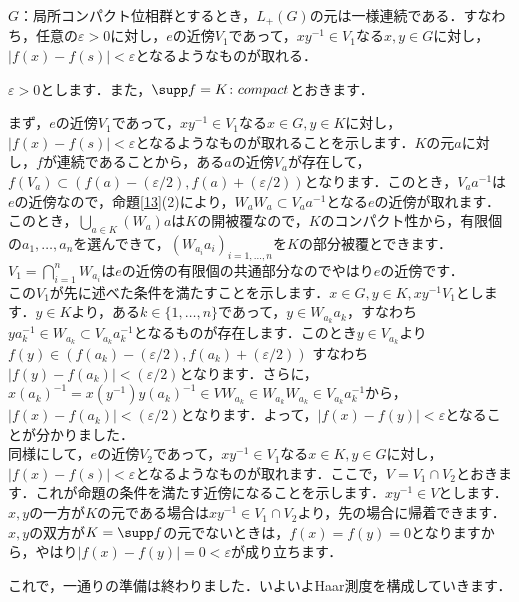 \begin{prop}\label{16}
$G$：局所コンパクト位相群とするとき，$L_{+}(G)$の元は一様連続である．すなわち，任意の$\varepsilon>0$に対し，$e$の近傍$V_1$であって，$xy^{-1} \in V_1$なる$x,y \in G$に対し，$|f(x)-f(s)|<\varepsilon$となるようなものが取れる．
\end{prop}
\begin{Proof}
$\varepsilon>0$とします．また，$\supp f=K \colon compact$とおきます．

まず，$e$の近傍$V_1$であって，$xy^{-1} \in V_1$なる$x \in G, y \in K$に対し，$|f(x)-f(s)|<\varepsilon$となるようなものが取れることを示します．$K$の元$a$に対し，$f$が連続であることから，ある$a$の近傍$V_a$が存在して，$f(V_a) \subset (f(a)-(\varepsilon /2), f(a)+(\varepsilon /2) )$となります．このとき，$V_{a}a^{-1}$は$e$の近傍なので，命題\ref{13}(2)により，$W_{a}W_{a} \subset V_{a}a^{-1}$となる$e$の近傍が取れます．このとき，$\bigcup_{a \in K}(W_a)a$は$K$の開被覆なので，$K$のコンパクト性から，有限個の$a_1, \ldots, a_n$を選んできて，$( W_{a_i}a_{i} )_{i=1,\ldots,n}$を$K$の部分被覆とできます．$V_1=\bigcap_{i=1}^{n}W_{a_i}$は$e$の近傍の有限個の共通部分なのでやはり$e$の近傍です．\\

この$V_1$が先に述べた条件を満たすことを示します．$x \in G, y \in K, xy^{-1} V_1$とします．$y \in K$より，ある$k \in \{1, \ldots , n \}$であって，$y \in W_{a_k}a_{k}$，すなわち$ya_{k}^{-1} \in W_{a_k} \subset V_{a_k}a_{k}^{-1}$となるものが存在します．このとき$y \in V_{a_k}$より$f(y) \in (f(a_k)-(\varepsilon/2), f(a_k)+(\varepsilon /2) )$ すなわち $|f(y)-f(a_k)|<(\varepsilon /2)$となります．さらに，$x(a_k)^{-1}=x(y^{-1})y(a_k)^{-1} \in VW_{a_k} \in W_{a_k}W_{a_k} \in V_{a_k}a_{k}^{-1}$から，$|f(x)-f(a_k)|<(\varepsilon /2)$となります．よって，$|f(x)-f(y)|<\varepsilon$となることが分かりました．\\

同様にして，$e$の近傍$V_2$であって，$xy^{-1} \in V_1$なる$x \in K, y \in G$に対し，$|f(x)-f(s)|<\varepsilon$となるようなものが取れます．ここで，$V=V_1 \cap V_2$とおきます．これが命題の条件を満たす近傍になることを示します．$xy^{-1} \in V$とします．$x,y$の一方が$K$の元である場合は$xy^{-1} \in V_1 \cap V_2$より，先の場合に帰着できます．$x,y$の双方が$K=\supp f$の元でないときは，$f(x)=f(y)=0$となりますから，やはり$|f(x)-f(y)|=0<\varepsilon$が成り立ちます．　
\end{Proof}

これで，一通りの準備は終わりました．いよいよHaar測度を構成していきます．

